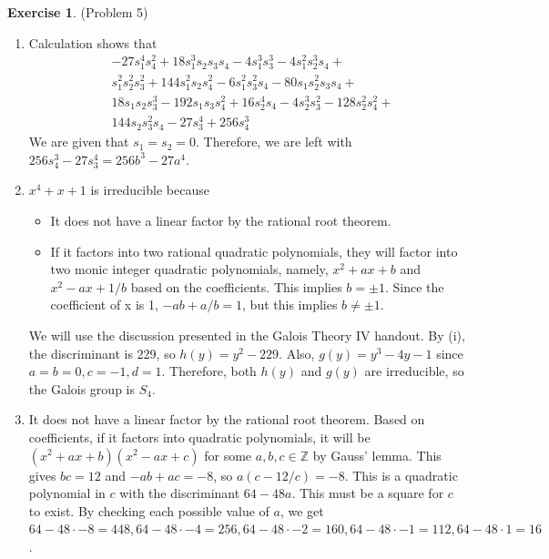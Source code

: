 \documentclass[12pt, psamsfonts]{amsart}
\theoremstyle{definition}
\newtheorem*{exer}{Exercise}
\theoremstyle{remark}
\numberwithin{equation}{section}
\begin{document}
\begin{exer}{(Problem 5)}
  \begin{enumerate}[label=(\roman*)]
    \item 
      Calculation shows that
      \begin{align*}
        &-27s_{1}^{4}s_{4}^{2}+18s_{1}^{3}s_{2}s_{3}s_{4}-4s_{1}^{3}s_{3}^{3}-4s_{1}^{2}s_{2}^{3}s_{4}+\\
        &s_{1}^{2}s_{2}^{2}s_{3}^{2}+144s_{1}^{2}s_{2}s_{4}^{2}-6s_{1}^{2}s_{3}^{2}s_{4}-80s_{1}s_{2}^{2}s_{3}s_{4}+\\
        &18s_{1}s_{2}s_{3}^{3}-192s_{1}s_{3}s_{4}^{2}+16s_{2}^{4}s_{4}-4s_{2}^{3}s_{3}^{2}-128s_{2}^{2}s_{4}^{2}+\\
        &144s_{2}s_{3}^{2}s_{4}-27s_{3}^{4}+256s_{4}^{3}
      \end{align*}
      We are given that $s_1 = s_2 = 0$.
      Therefore, we are left with $256s_4^3 - 27s_3^4 = 256b^3 - 27a^4$.
    \item
      $x^4 + x + 1$ is irreducible because
      \begin{itemize}
        \item
          It does not have a linear factor by the rational root theorem.
        \item
          If it factors into two rational quadratic polynomials, they will factor into two monic integer quadratic polynomials, namely, $x^2 + ax + b$ and $x^2 - ax + 1/b$ based on the coefficients.
          This implies $b = \pm 1$.
          Since the coefficient of x is 1, $-ab + a/b = 1$, but this implies $b \ne \pm 1$.
      \end{itemize}
      We will use the discussion presented in the Galois Theory IV handout.
      By (i), the discriminant is 229, so $h(y) = y^2 - 229$.
      Also, $g(y) = y^3 - 4y - 1$ since $a = b = 0, c = -1, d = 1$.
      Therefore, both $h(y)$ and $g(y)$ are irreducible, so the Galois group is $S_4$.
    \item
      It does not have a linear factor by the rational root theorem.
      Based on coefficients, if it factors into quadratic polynomials, it will be $(x^2 + ax + b)(x^2 - ax + c)$ for some $a, b, c \in \mathbb{Z}$ by Gauss' lemma.
      This gives $bc = 12$ and $-ab + ac = -8$, so $a(c - 12/c) = -8$.
      This is a quadratic polynomial in $c$ with the discriminant $64 - 48a$.
      This must be a square for $c$ to exist.
      By checking each possible value of $a$, we get $64 - 48 \cdot -8 = 448, 64 - 48 \cdot -4 = 256, 64 - 48 \cdot -2 = 160, 64 - 48 \cdot -1 = 112, 64 - 48 \cdot 1 = 16$.

\end{enumerate}
\end{exer}
\end{document}
